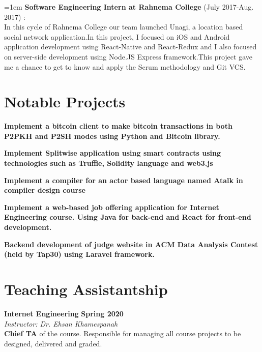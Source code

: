 \documentclass[line, mm]{sampleCV}
\begin{document}
\begin{resume}
\hangindent=1em
\textbf{Software Engineering Intern at Rahnema College} (July 2017-Aug. 2017) : \\
 In this cycle of Rahnema College our team launched Unagi, a location based social network application.In this project, I focused on iOS and Android application development using React-Native and React-Redux	 and I also focused on server-side development using Node.JS Express framework.This project gave me a chance to get to know and apply the Scrum methodology and Git VCS.

\section{\mysidestyle Notable Projects}
\begin{list2}

\item \textbf {Implement a bitcoin client to make bitcoin transactions in both P2PKH and P2SH modes using Python and Bitcoin library.} 
\item \textbf {Implement Splitwise application using smart contracts using technologies such as Truffle, Solidity language and web3.js}
\item \textbf {Implement a compiler for an actor based language named Atalk in compiler design course} 
\item \textbf {Implement a web-based job offering application for Internet Engineering course. Using Java for back-end and React for front-end development.} 
\item \textbf{Backend development of judge website in ACM Data Analysis Contest (held by Tap30) using Laravel framework.}

\end{list2}

\section{\mysidestyle Teaching Assistantship}
\textbf{Internet Engineering} \hfill \textbf{Spring 2020}\\
{\it Instructor:  Dr. Ehsan Khamespanah}
\\
\textbf{Chief TA} of the course. Responsible for managing all course projects to be designed, delivered and graded.



\end{resume}
\end{document}

